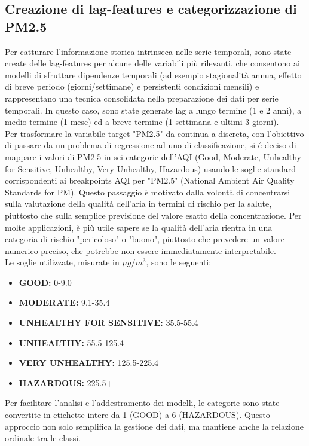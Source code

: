 \documentclass[a4paper,12pt]{report}
\begin{document}
	\subsection{Creazione di lag-features e categorizzazione di PM2.5}
	
	Per catturare l'informazione storica intrinseca nelle serie temporali, sono state create delle lag-features per alcune delle variabili più rilevanti, che consentono ai modelli di sfruttare dipendenze temporali (ad esempio stagionalità annua, effetto di breve periodo (giorni/settimane) e persistenti condizioni mensili) e rappresentano una tecnica consolidata nella preparazione dei dati per serie temporali. In questo caso, sono state generate lag a lungo termine (1 e 2 anni), a medio termine (1 mese) ed a breve termine (1 settimana e ultimi 3 giorni). \\
	Per trasformare la variabile target "PM2.5" da continua a discreta, con l'obiettivo di passare da un problema di regressione ad uno di classificazione, si é deciso di mappare i valori di PM2.5 in sei categorie dell'AQI (Good, Moderate, Unhealthy for Sensitive, Unhealthy, Very Unhealthy, Hazardous) usando le soglie standard corrispondenti ai breakpoints AQI per "PM2.5" (National Ambient Air Quality Standards for PM). Questo passaggio è motivato dalla volontà di concentrarsi sulla valutazione della qualità dell'aria in termini di rischio per la salute, piuttosto che sulla semplice previsione del valore esatto della concentrazione. Per molte applicazioni, è più utile sapere se la qualità dell'aria rientra in una categoria di rischio "pericoloso" o "buono", piuttosto che prevedere un valore numerico preciso, che potrebbe non essere immediatamente interpretabile.\\
	Le soglie utilizzate, misurate in $\mu g/m^3$, sono le seguenti:
	\begin{itemize}
		\item \textbf{GOOD:} 0-9.0
		\item \textbf{MODERATE:} 9.1-35.4
		\item \textbf{UNHEALTHY FOR SENSITIVE:} 35.5-55.4
		\item \textbf{UNHEALTHY:} 55.5-125.4
		\item \textbf{VERY UNHEALTHY:} 125.5-225.4
		\item \textbf{HAZARDOUS:} 225.5+
	\end{itemize}
	Per facilitare l'analisi e l'addestramento dei modelli, le categorie sono state convertite in etichette intere da 1 (GOOD) a 6 (HAZARDOUS). Questo approccio non solo semplifica la gestione dei dati, ma mantiene anche la relazione ordinale tra le classi.
	
\end{document}
